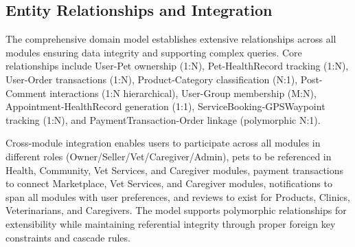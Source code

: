 \subsection{Entity Relationships and Integration}

The comprehensive domain model establishes extensive relationships across all modules ensuring data integrity and supporting complex queries. Core relationships include User-Pet ownership (1:N), Pet-HealthRecord tracking (1:N), User-Order transactions (1:N), Product-Category classification (N:1), Post-Comment interactions (1:N hierarchical), User-Group membership (M:N), Appointment-HealthRecord generation (1:1), ServiceBooking-GPSWaypoint tracking (1:N), and PaymentTransaction-Order linkage (polymorphic N:1).

Cross-module integration enables users to participate across all modules in different roles (Owner/Seller/Vet/Caregiver/Admin), pets to be referenced in Health, Community, Vet Services, and Caregiver modules, payment transactions to connect Marketplace, Vet Services, and Caregiver modules, notifications to span all modules with user preferences, and reviews to exist for Products, Clinics, Veterinarians, and Caregivers. The model supports polymorphic relationships for extensibility while maintaining referential integrity through proper foreign key constraints and cascade rules.


